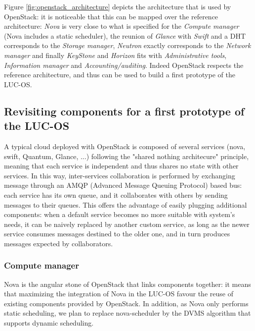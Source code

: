 Figure \ref{fig:openstack_architecture} depicts the architecture that is used by
OpenStack: it is noticeable that this can be mapped over the reference 
architecture: \emph{Nova} is very close to what is specified for the 
\emph{Compute manager} (Nova includes a static scheduler), the reunion of 
\emph{Glance} with \emph{Swift} and a DHT corresponds to the \emph{Storage 	
manager}, \emph{Neutron} exactly corresponds to the \emph{Network manager} and 
finally \emph{KeyStone} and \emph{Horizon} fits with 
\emph{Administrative tools}, \emph{Information manager} and 
\emph{Accounting/auditing}. Indeed OpenStack respects the reference 
architecture, and thus can be used to build a first prototype of the LUC-OS.

\subsection{Revisiting components for a first prototype of the LUC-OS}
\label{sub:sec:revisiting_openstack}

A typical cloud deployed with OpenStack is composed of several services (nova, 
swift, Quantum, Glance, ...) following the "shared nothing architecure" 
principle, meaning that each service is independent and thus shares no state 
with other services. In this way, inter-services collaboration is performed by 
exchanging message through an AMQP (Advanced Message Queuing Protocol) based 
bus: each service has its own queue, and it collaborates with others by sending 
messages to their queues. This offers the advantage of easily plugging 
additional components: when a default service becomes no more suitable with 
system's needs, it can be naively replaced by another custom service, as long as
the newer service consumes messages destined to the older one, and in turn 
produces messages expected by collaborators.

\subsubsection{Compute manager}
Nova is the angular stone of OpenStack that links components together: it means
that maximizing the integration of Nova in the LUC-OS favour the reuse of 
existing components provided by OpenStack. In addition, as Nova only performs
static scheduling, we plan to replace nova-scheduler by the DVMS algorithm that 
supports dynamic scheduling.

